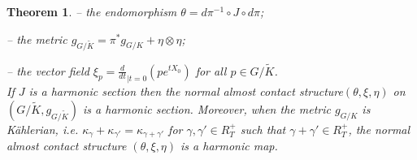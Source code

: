 \documentclass[a4paper,reqno]{amsart}
\theoremstyle{definition}
\theoremstyle{remark}
\theoremstyle{plain}
\newtheorem{mainthm}{Theorem}
\numberwithin{equation}{section}
\newcommand{\wK}{{\widetilde{K}}}
\newcommand{\NACS}{normal almost contact structure\xspace}
\begin{document}
\begin{mainthm}
   -- the endomorphism $\theta = d\pi^{-1}\circ J\circ d\pi$;

    -- the metric  
   $g_{\scriptscriptstyle{G/\wK}} = \pi^* g_{\scriptscriptstyle{G/K}} + \eta \otimes \eta$;

   -- the vector field
   $\xi_p = \frac{d}{dt}_{\mid t = 0}(pe^{tX_0})$ for all
   $p \in G/\wK$.
   \\
   If $J$ is a harmonic section then the \NACS $(\theta,\xi,\eta)$ on
   $(G/\wK, g_{\scriptscriptstyle{G/\wK}})$ is a harmonic
   section. Moreover, when the metric
   $g_{\scriptscriptstyle{G/K}}$  is K\"ahlerian, i.e.
   $\kappa_\gamma + \kappa_{\gamma'} = \kappa_{\gamma + \gamma'}$
   for $\gamma, \gamma' \in R_T^ +$ such that
   $\gamma + \gamma' \in R_T^+$, the \NACS
   $(\theta,\xi,\eta)$ is a harmonic map.
 \end{mainthm}
\end{document}

